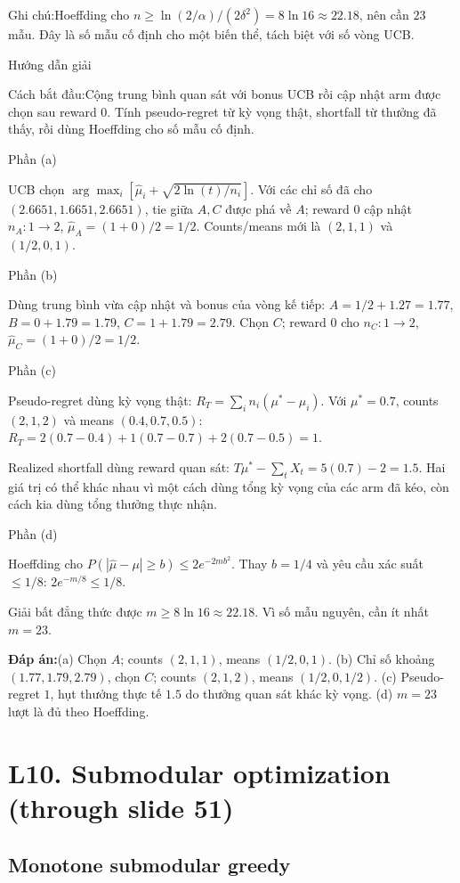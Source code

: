 \documentclass[10pt,a4paper,twocolumn]{article}
\makeatletter
\newcommand{\maptag}[1]{\phantomsection\@bsphack\protected@write\@auxout{}{\string\newlabel{#1}{{}{\thepage}{}{\@currentHref}{}}}\@esphack}
\newcommand{\lecture}[2]{%
  \par
  \section{L#1. #2}\label{lecture:#1}}
\newif\ifexamheadingprinted
\newcommand{\topic}[2]{%
  \global\examheadingprintedfalse\par\subsection{#2}\label{topic:#1}}
\newcommand{\key}[1]{#1:\enspace}
\newcommand{\solutionprompt}[1]{\par\addvspace{1pt}\noindent\key{Cách bắt đầu}#1\par\addvspace{2pt}}
\newcommand{\examnote}[1]{\par\addvspace{2pt}\noindent\key{Ghi chú}#1\par\addvspace{3pt}}
\newcommand{\blocklabel}[1]{\par\noindent#1\par\nobreak}
\newcommand{\answer}[1]{%
  \par\addvspace{3pt}%
  \blocklabel{#1Hướng dẫn giải}}
\newcommand{\finalanswer}[1]{%
  \par\addvspace{3pt}\noindent\textbf{Đáp án:}\nobreak\enspace#1\par}
\newcommand{\guidepart}[1]{%
  \par\addvspace{1.5pt}%
  \blocklabel{Phần #1}}
\makeatother
\begin{document}
\examnote{Hoeffding cho $n\ge\ln(2/\alpha)/(2\delta^2)=8\ln16\approx22.18$, nên cần $23$ mẫu. Đây là số mẫu cố định cho một biến thể, tách biệt với số vòng UCB.}
\answer{\maptag{answer:Pr29}}
\solutionprompt{Cộng trung bình quan sát với bonus UCB rồi cập nhật arm được chọn sau reward 0. Tính pseudo-regret từ kỳ vọng thật, shortfall từ thưởng đã thấy, rồi dùng Hoeffding cho số mẫu cố định.}
\guidepart{(a)}
\begin{guidesteps}
\item UCB chọn $\arg\max_i[\hat\mu_i+\sqrt{2\ln(t)/n_i}]$. Với các chỉ số đã cho $(2.6651,1.6651,2.6651)$, tie giữa $A,C$ được phá về $A$; reward 0 cập nhật $n_A:1\to2$, $\hat\mu_A=(1+0)/2=1/2$. Counts/means mới là $(2,1,1)$ và $(1/2,0,1)$.
\end{guidesteps}
\guidepart{(b)}
\begin{guidesteps}
\item Dùng trung bình vừa cập nhật và bonus của vòng kế tiếp: $A=1/2+1.27=1.77$, $B=0+1.79=1.79$, $C=1+1.79=2.79$. Chọn $C$; reward 0 cho $n_C:1\to2$, $\hat\mu_C=(1+0)/2=1/2$.
\end{guidesteps}
\guidepart{(c)}
\begin{guidesteps}
\item Pseudo-regret dùng kỳ vọng thật: $R_T=\sum_i n_i(\mu^*-\mu_i)$. Với $\mu^*=0.7$, counts $(2,1,2)$ và means $(0.4,0.7,0.5)$: $R_T=2(0.7-0.4)+1(0.7-0.7)+2(0.7-0.5)=1$.
\item Realized shortfall dùng reward quan sát: $T\mu^*-\sum_tX_t=5(0.7)-2=1.5$. Hai giá trị có thể khác nhau vì một cách dùng tổng kỳ vọng của các arm đã kéo, còn cách kia dùng tổng thưởng thực nhận.
\end{guidesteps}
\guidepart{(d)}
\begin{guidesteps}
\item Hoeffding cho $P(|\hat\mu-\mu|\ge b)\le2e^{-2mb^2}$. Thay $b=1/4$ và yêu cầu xác suất $\le1/8$: $2e^{-m/8}\le1/8$.
\item Giải bất đẳng thức được $m\ge8\ln16\approx22.18$. Vì số mẫu nguyên, cần ít nhất $m=23$.
\end{guidesteps}
\finalanswer{(a) Chọn $A$; counts $(2,1,1)$, means $(1/2,0,1)$. (b) Chỉ số khoảng $(1.77,1.79,2.79)$, chọn $C$; counts $(2,1,2)$, means $(1/2,0,1/2)$. (c) Pseudo-regret $1$, hụt thưởng thực tế $1.5$ do thưởng quan sát khác kỳ vọng. (d) $m=23$ lượt là đủ theo Hoeffding.}

\lecture{10}{Submodular optimization (through slide 51)}
\topic{greedy}{Monotone submodular greedy}
\end{document}
